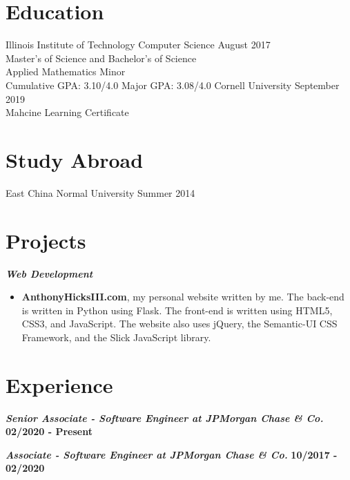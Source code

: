 \documentclass[10pt]{res}
\begin{document}
\address{www.anthonyhicksiii.com \\ https://github.com/TheRealMingo \\ https://www.codementor.io/anthonyhicks}
\address{anthony@anthonyhicksiii.com}

\setlength\itemsep{0em}

\begin{resume}
\section{Education}
	Illinois Institute of Technology \hfill
	{\centering Computer Science} 
	 \hfill August 2017 \\
	Master's of Science and Bachelor's of Science \\
	Applied Mathematics Minor \\
	Cumulative GPA: 3.10/4.0 \hfill
	Major GPA: 3.08/4.0
	\newline
	\newline
	Cornell University \hfill September 2019 \\
	Mahcine Learning Certificate
\section{Study Abroad}
	East China Normal University \hfill Summer 2014  
\section{Projects} 
\textbf{\textit{Web Development}}
	\vspace*{.25em}
	\begin{itemize}
		\item \textbf{AnthonyHicksIII.com}, my personal website written by me. The back-end is written in Python using Flask. The front-end is written using HTML5, CSS3, and JavaScript. The website also uses jQuery, the Semantic-UI CSS Framework, and the Slick JavaScript library.
	\end{itemize}

\section{Experience}
	\textbf{\textit{Senior Associate - Software Engineer at JPMorgan Chase \& Co.}}
	\hfill{\bf 02/2020 - Present}

	\textbf{\textit{Associate - Software Engineer at JPMorgan Chase \& Co.}}
	\hfill{\bf 10/2017 - 02/2020}


\end{resume}
\end{document}
